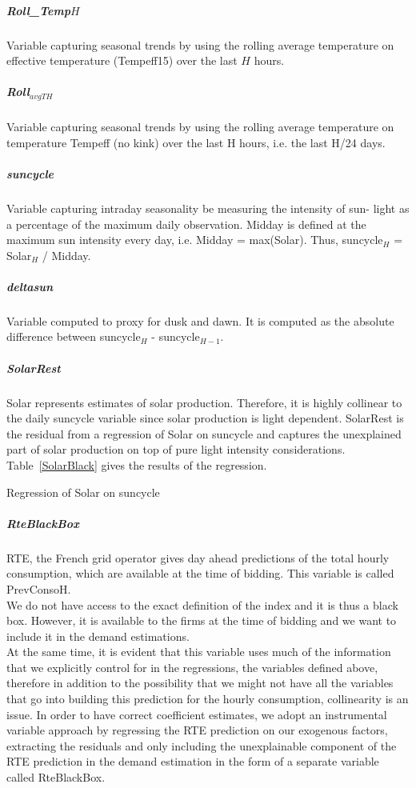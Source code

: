\subparagraph{Roll\_Temp$H$}
\label{rolltemp720}
Variable capturing seasonal trends by using the rolling average temperature on effective temperature (Tempeff15) over the last $H$ hours.

\subparagraph{Roll$_{avgTH}$} Variable capturing seasonal trends by using the rolling average temperature on temperature Tempeff (no kink) over the last H hours, i.e. the last H/24 days.

\subparagraph{suncycle}\label{suncycle} Variable capturing intraday seasonality be measuring the intensity of sun- light as a percentage of the maximum daily observation. Midday is defined at the maximum sun intensity every day, i.e. Midday = max(Solar). Thus, suncycle$_H$ = Solar$_H$ / Midday.

\subparagraph{deltasun}\label{deltasun} Variable computed to proxy for dusk and dawn. It is computed as the absolute difference between suncycle$_H$ - suncycle$_{H−1}$.

\subparagraph{SolarRest}
\label{SolarRest}
Solar represents estimates of solar production. Therefore, it is highly collinear to the daily suncycle variable since solar production is light dependent. %
SolarRest is the residual from a regression of Solar on suncycle %
and captures the unexplained part of solar production on top of pure light intensity considerations. Table~\ref{SolarBlack} gives the results of the regression.
\begin{table}[H]

\caption{\label{SolarBlack} Regression of Solar on suncycle}
\end{table}

\subparagraph{RteBlackBox}
\label{RteBlackBox}
RTE, the French grid operator gives day ahead predictions of the total hourly consumption, which are available at the time of bidding. This variable is called PrevConsoH. \\

We do not have access to the exact definition of the index and it is thus a black box. However, it is available to the firms at the time of bidding and we want to include it in the demand estimations. \\

At the same time, it is evident that this variable uses much of the information that we explicitly control for in the regressions, the variables defined above, therefore in addition to the possibility that we might not have all the variables that go into building this prediction for the hourly consumption, collinearity is an issue. In order to have correct coefficient estimates, we adopt an instrumental variable approach by regressing the RTE prediction on our exogenous factors, extracting the residuals and only including the unexplainable component of the RTE prediction in the demand estimation in the form of a separate variable called RteBlackBox.\\

